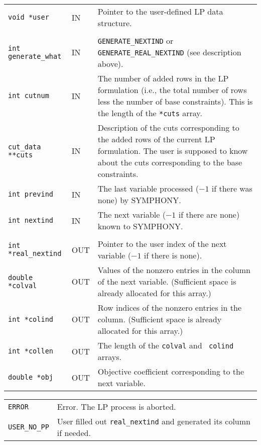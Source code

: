 \documentclass[twoside,11pt]{article}
\begin{document}
{\newpage
\clearpage
\samepage \begin{tabular}{llp{287.365pt}}
{\tt void *user} &  IN & Pointer to the user-defined LP data structure. \\ 
& & \\ 
{\tt int generate\_what} & IN & {\tt GENERATE\_NEXTIND} or {\tt
GENERATE\_REAL\_NEXTIND} (see description above). \\ 
{\tt int cutnum} & IN & The number of added rows in the LP formulation
(i.e., the total number of rows less the number of base constraints).
This is the length of the {\tt **cuts} array.\\  
{\tt cut\_data **cuts} & IN & Description of the cuts corresponding to
the added rows of the current LP formulation. The user is supposed to
know about the cuts corresponding to the base constraints. \\ 
{\tt int prevind} & IN & The last variable processed ($-1$ if there was
none) by {\sc SYMPHONY}.\\ 
{\tt int nextind} & IN & The next variable ($-1$ if there are none)
known to {\sc SYMPHONY}.\\ 
& & \\ 
{\tt int *real\_nextind} & OUT & Pointer to the user index of the next
variable ($-1$ if there is none). \\ 
{\tt double *colval} & OUT & Values of the nonzero entries in the
column of the next variable. (Sufficient space is already allocated for this
array.) \\ 
{\tt int *colind} & OUT & Row indices of the nonzero entries in the column.
(Sufficient space is already allocated for this array.) \\ 
{\tt int *collen} & OUT & The length of the {\tt colval} and {\tt
colind} arrays.\\ 
{\tt double *obj} & OUT & Objective coefficient corresponding to the
next variable.\\ 
\end{tabular}
}

{\newpage
\clearpage
\samepage \begin{tabular}{lp{371.195pt}}
{\tt ERROR} & Error. The LP process is aborted.\\ 
{\tt USER\_NO\_PP} & User filled out {\tt *real\_nextind} and
generated its column if needed.\\ 
\end{tabular}
}
\end{document}
